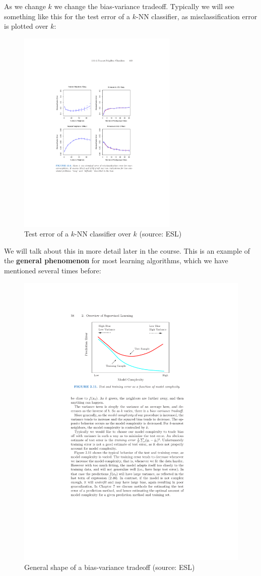 \documentclass[11pt]{article}
\begin{document}
As we change $k$ we change the bias-variance tradeoff. Typically we will see
something like this for the test error of a $k$-NN classifier, as
misclassification error is plotted over $k$:

 \begin{figure}[H]
  \centering
  \includegraphics[width=3in]{esl_nn_vary.pdf}
  \caption{Test error of a $k$-NN classifier over $k$ (source: ESL)}
\end{figure}


We will talk about this in more detail later in the course. This is an example
of the {\bf general phenomenon} for most learning algorithms, which we have mentioned several times before: 

 \begin{figure}[h!]
  \centering
  \includegraphics[width=4.5in]{ESL_bias_variance.pdf}
  \caption{General shape of a bias-variance tradeoff (source: ESL)}
\end{figure}
\end{document}
